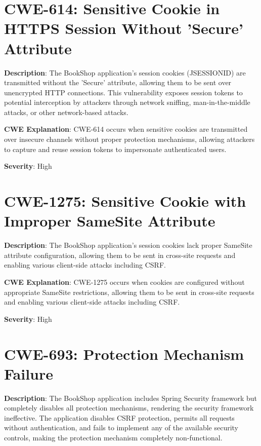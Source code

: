 \documentclass[]{UCD_CS_FYP_Report}
\begin{document}
\section{CWE-614: Sensitive Cookie in HTTPS Session Without 'Secure' Attribute}

\textbf{Description}: The BookShop application's session cookies (JSESSIONID) are transmitted without the 'Secure' attribute, allowing them to be sent over unencrypted HTTP connections. This vulnerability exposes session tokens to potential interception by attackers through network sniffing, man-in-the-middle attacks, or other network-based attacks.

\textbf{CWE Explanation}: CWE-614 occurs when sensitive cookies are transmitted over insecure channels without proper protection mechanisms, allowing attackers to capture and reuse session tokens to impersonate authenticated users.

\textbf{Severity}: High



\section{CWE-1275: Sensitive Cookie with Improper SameSite Attribute}

\textbf{Description}: The BookShop application's session cookies lack proper SameSite attribute configuration, allowing them to be sent in cross-site requests and enabling various client-side attacks including CSRF.

\textbf{CWE Explanation}: CWE-1275 occurs when cookies are configured without appropriate SameSite restrictions, allowing them to be sent in cross-site requests and enabling various client-side attacks including CSRF.

\textbf{Severity}: High



\section{CWE-693: Protection Mechanism Failure}

\textbf{Description}: The BookShop application includes Spring Security framework but completely disables all protection mechanisms, rendering the security framework ineffective. The application disables CSRF protection, permits all requests without authentication, and fails to implement any of the available security controls, making the protection mechanism completely non-functional.
\end{document}
